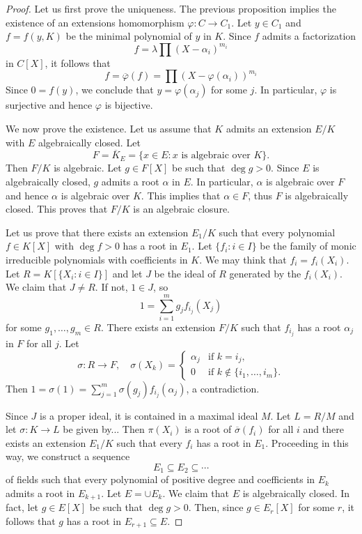 \begin{proof}
    Let us first prove the uniqueness. The previous proposition implies the existence of 
    an extensions homomorphism $\varphi\colon C\to C_1$. Let $y\in C_1$ and $f=f(y,K)$ be 
    the minimal polynomial of $y$ in $K$. Since $f$ admits a factorization
    \[
        f=\lambda\prod (X-\alpha_i)^{m_i}
    \]
    in $C[X]$, it follows that
    \[
    f=\overline{\varphi}(f)=\prod (X-\varphi(\alpha_i))^{m_i}
    \]
    Since $0=f(y)$, we conclude that $y=\varphi(\alpha_j)$ for some $j$. In particular, $\varphi$ is
    surjective and hence $\varphi$ is bijective. 
    
    We now prove the existence. Let us assume that $K$ admits an extension $E/K$ 
    with $E$ algebraically closed. Let 
    \[
    	F=\overline{K}_E=\{x\in E:x\text{ is algebraic over }K\}. 
    \]
    Then $F/K$ is algebraic. Let $g\in F[X]$ be such that
    $\deg g>0$. Since $E$ is algebraically closed, $g$ admits a root $\alpha$ in $E$. In particular, $\alpha$
    is algebraic over $F$ and hence $\alpha$ is algebraic over $K$. This implies that $\alpha\in F$, thus
    $F$ is algebraically closed. This proves that $F/K$ is an algebraic closure. 
    
    Let us prove that there exists an extension $E_1/K$ such that
    every polynomial $f\in K[X]$ with $\deg f>0$ has a root in $E_1$. Let 
    $\{f_i:i\in I\}$ be the family of monic irreducible polynomials with coefficients in $K$. 
    We may think that $f_i=f_i(X_i)$. 
    Let $R=K[\{X_i:i\in I\}]$ and let $J$ be the ideal of $R$ 
    generated by the $f_i(X_i)$. We claim that $J\ne R$. If not, $1\in J$, so
    \[
    1=\sum_{i=1}^m g_jf_{i_j}(X_j)
    \]
    for some $g_1,\dots,g_m\in R$. There exists an extension $F/K$ such that
    $f_{i_j}$ has a root $\alpha_j$ in $F$ for all $j$. Let 
    \[
    \sigma\colon R\to F,\quad
    \sigma(X_k)=\begin{cases}
        \alpha_j & \text{if $k=i_j$},\\
        0 & \text{if $k\not\in\{i_1,\dots,i_m\}$}.
        \end{cases}
    \]
    Then $1=\sigma(1)=\sum_{j=1}^m\sigma(g_j)f_{i_j}(\alpha_j)$, a contradiction. 
    
    Since $J$ is a proper ideal, it is contained in a maximal ideal $M$. Let $L=R/M$ 
    and let $\sigma\colon K\to L$ be given by...
    Then $\pi(X_i)$ is a root of $\overline{\sigma}(f_i)$ for all $i$ 
    and there exists an extension $E_1/K$ such that
    every $f_i$ has a root in $E_1$. Proceeding in this way, we construct
    a sequence
    \[
    E_1\subseteq E_2\subseteq\cdots
    \]
    of fields such that every polynomial of positive degree and coefficients in $E_k$ 
    admits a root in $E_{k+1}$. Let $E=\cup E_k$. We claim that $E$ is algebraically closed. In fact, 
    let $g\in E[X]$ be such that $\deg g>0$. Then, since $g\in E_r[X]$ for some $r$, it follows
    that $g$ has a root in $E_{r+1}\subseteq E$. 
\end{proof}

